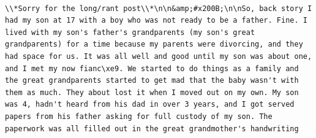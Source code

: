 \documentclass[
  letterpaper,
  DIV=11,
  numbers=noendperiod]{scrreprt}
\begin{document}
\begin{verbatim}
                                                                                                                                                                                                                                                                                                                                                                                                                                                                                                                                                                                                                                                                                                                                                                                                                                                                                                                                                                                                                                                                                                                                                                                                                                                                                                                                                                                                                                                                                                                                                                                                                                                                                                                                                                                                                                                                                                                                                                                                                                                                                                                                                                                                                                                                                                                                                                                                                                                             \\*Sorry for the long/rant post\\*\n\n&amp;#x200B;\n\nSo, back story I had my son at 17 with a boy who was not ready to be a father. Fine. I lived with my son's father's grandparents (my son's great grandparents) for a time because my parents were divorcing, and they had space for us. It was all well and good until my son was about one, and I met my now fianc\xe9. We started to do things as a family and the great grandparents started to get mad that the baby wasn't with them as much. They about lost it when I moved out on my own. My son was 4, hadn't heard from his dad in over 3 years, and I got served papers from his father asking for full custody of my son. The paperwork was all filled out in the great grandmother's handwriting 
\end{verbatim}
\end{document}

